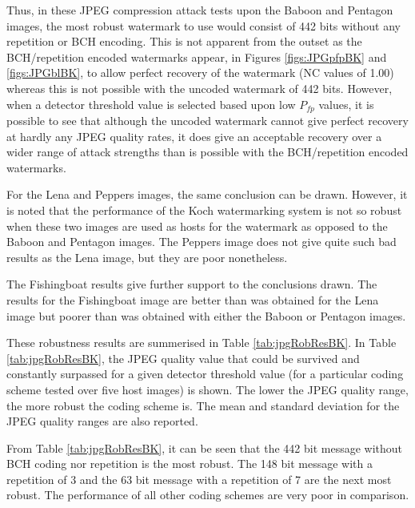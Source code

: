 \documentclass[12pt]{report}
\begin{document}
Thus, in these JPEG compression attack tests upon the Baboon and Pentagon images, the most robust watermark to use would consist of
442 bits without any repetition or BCH encoding. This is not apparent from the outset as the BCH/repetition encoded
watermarks appear, in Figures \ref{figs:JPGpfpBK} and \ref{figs:JPGblBK},
to allow perfect recovery of the watermark (NC values of 1.00) whereas this is
not possible with the uncoded watermark of 442 bits. However, when a detector threshold value is selected based upon low
$P_{fp}$ values, it is possible to see that although the uncoded watermark cannot give perfect recovery at hardly any
JPEG quality rates, it does give an acceptable recovery over a wider range of attack strengths than is possible with the
BCH/repetition encoded watermarks.

For the Lena and Peppers images, the same conclusion can be drawn. However, it is noted that the performance of the
Koch watermarking system is not so robust when these two images are used as hosts for the watermark as opposed to the 
Baboon and Pentagon images. 
The Peppers image
does not give quite such bad results as the Lena image, but they are poor nonetheless. 

The Fishingboat results give further 
support to the conclusions drawn. The results for the Fishingboat image are better than was obtained for the Lena 
image but poorer than was obtained with either the Baboon or Pentagon images.

These robustness results are summerised in Table \ref{tab:jpgRobResBK}. In Table \ref{tab:jpgRobResBK}, the JPEG 
quality value that could be survived and constantly surpassed for a given detector threshold value (for 
a particular coding scheme tested over five host images) is shown. The lower the JPEG quality range, the
more robust the coding scheme is. The mean and standard deviation for the JPEG quality ranges are also reported.

From Table \ref{tab:jpgRobResBK}, it can be seen that the 442 bit message without BCH coding nor repetition is the most robust.
The 148 bit message with a repetition of 3 and the 63 bit message with a repetition of 7 are the next most robust.
The performance of all other coding schemes are very 
poor in comparison. 
\end{document}
